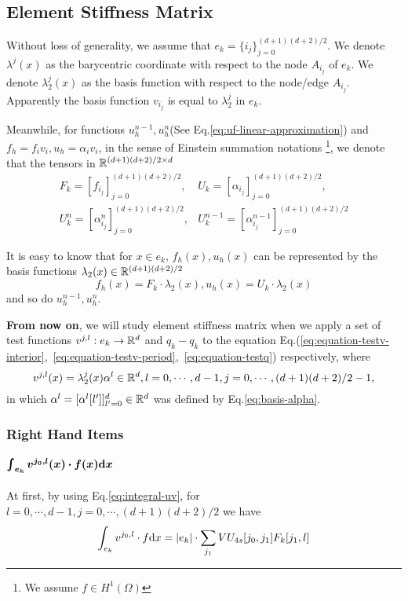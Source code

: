 \subsection{Element Stiffness Matrix}
Without loss of generality, we assume that $e_k=\{i_j\}_{j=0}^{(d+1)(d+2)/2}$.
We denote $\lambda^j(x)$ as the barycentric coordinate with respect to 
the node $A_{i_j}$ of $e_k$. 
We denote $\lambda^j_2(x)$ as the basis function with respect to 
the node/edge $A_{i_j}$.
Apparently the basis function $v_{i_j}$ is equal to $\lambda^j_2$ in $e_k$.

Meanwhile, for functions $u_h^{n-1},u_h^n$(See Eq.\eqref{eq:uf-linear-approximation}) 
and $f_h=f_iv_i,u_h=\alpha_iv_i$, 
in the sense of Einstein summation notations
\footnote{We assume $f\in H^1(\Omega)$}, 
we denote that the tensors in $\mathbb{R}^{(d+1)(d+2)/2\times d}$
\[
  \begin{split}
    F_k=[f_{i_j}]_{j=0}^{(d+1)(d+2)/2},& U_k=[\alpha_{i_j}]_{j=0}^{(d+1)(d+2)/2},\\
    U_{k}^{n}=[\alpha_{i_j}^{n}]_{j=0}^{(d+1)(d+2)/2}, &
    U_{k}^{n-1}=[\alpha_{i_j}^{n-1}]_{j=0}^{(d+1)(d+2)/2} 
  \end{split}
\]

It is easy to know that for $x\in e_k$, $f_h(x),u_h(x)$ can be represented by 
the basis functions $\lambda_2(x)\in\mathbb{R}^{(d+1)(d+2)/2}$
\[f_h(x)=F_k\cdot\lambda_2(x),u_h(x)=U_k\cdot\lambda_2(x)\]
and so do $u_h^{n-1},u_h^n$. 

\textbf{From now on}, we will study element stiffness matrix when we apply 
a set of test functions $v^{j,l}:e_k\to\mathbb{R}^{d}$ and 
$q_k-q_k$ to the equation 
Eq.(\ref{eq:equation-testv-interior},~\ref{eq:equation-testv-period},~\ref{eq:equation-testq}) respectively, where
\[v^{j,l}(x)=\lambda_2^j(x)\alpha^l\in\mathbb{R}^{d},l=0,\cdots,d-1,j=0,\cdots,(d+1)(d+2)/2-1,\]
in which $\alpha^l=[\alpha^l[l']]_{l'=0}^d\in\mathbb{R}^{d}$ 
was defined by Eq.\eqref{eq:basis-alpha}.

\subsubsection{Right Hand Items}
\paragraph{$\bm{\int_{e_k}v^{j_0,l}(x)\cdot f(x)\mathrm{d} x}$}
At first, by using Eq.\eqref{eq:integral-uv}, for 
$l=0,\cdots,d-1,j=0,\cdots,(d+1)(d+2)/2$ we have
\begin{equation}
  \int_{e_k}v^{j_0,l}\cdot f\mathrm{d} x = |e_k|\cdot \sum_{j_1}VU_{4s}[j_0,j_1]F_k[j_1,l]
\end{equation}

